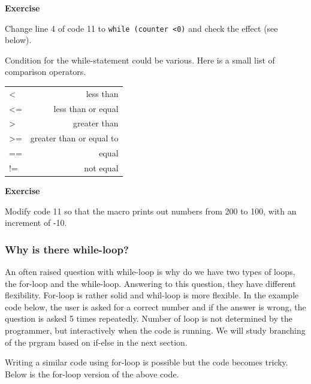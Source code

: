 \documentclass[11pt,a4paper,oneside]{report}
\newenvironment{indentexercise}[1]%
{{\setlength{\leftmargin}{2em}}%
\textbf{Exercise \thesubsection-#1}%
\begin{list}{}%
	\item%
}
{\end{list}}
\newenvironment{indentCom}%
{\begin{list}{}%
         {\setlength{\leftmargin}{1em}}%
         \item[]%
}
{\end{list}}
\newcommand{\ilcom}[1]{\texttt{\small#1}}
\begin{document}
\begin{indentexercise}{2}
Change line 4 of code 11 to \ilcom{while (counter <0)} and check the effect (see below).
\end{indentexercise}



Condition for the while-statement could be various. Here is a small list of comparison operators.

\begin{indentCom}
 \begin{tabular*}{0.5\textwidth}{ l r }
< & less than \\
<= & less than or equal\\ 
> & greater than\\ 
>= & greater than or equal to\\
== & equal\\
!= & not equal\\
 \end{tabular*}
\end{indentCom}

\begin{indentexercise}{3}
Modify code 11 so that the macro prints out numbers from 200 to 100, with an increment of -10. 
\end{indentexercise}

\subsubsection{Why is there while-loop?}

An often raised question with while-loop is why do we have two types of loops, 
the for-loop and the while-loop. Answering to this question, they have different
flexibility. For-loop is rather solid and whil-loop is more flexible. In the
example code below, the user is asked for a correct number and if the answer is wrong, the
question is asked 5 times repeatedly. Number of loop is not determined by the
programmer, but interactively when the code is running. We will study
branching of the prgram based on if-else in the next section.  



Writing a similar code using for-loop is possible but the code becomes tricky.
Below is the for-loop version of the above code.  


\end{document}
